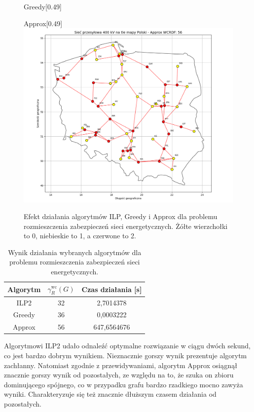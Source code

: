 \begin{figure}[htbp]
\begin{subcaptionbox}{Greedy\label{fig:img2}}[0.49\linewidth]
    \end{subcaptionbox}
    \hfill
    \begin{subcaptionbox}{Approx\label{fig:img1}}[0.49\linewidth]
        {\includegraphics[width=\linewidth]{assets/Poland/img_1.png}}
    \end{subcaptionbox}
    \caption{Efekt działania algorytmów ILP, Greedy i Approx dla problemu rozmieszczenia zabezpieczeń sieci energetycznych. Żółte wierzchołki to 0, niebieskie to 1, a czerwone to 2.}
    \label{fig:poland}
\end{figure}

\begin{table}[H]
    \centering
    \begin{tabular}{|c|c|c|}
        \hline
    Algorytm & $\gamma^{\text{wc}}_R(G)$ & Czas działania [s] \\     \hline
    ILP2 & 32 & 2,7014378 \\ \hline
    Greedy & 36 & 0,0003222 \\ \hline
Approx & 56 & 647,6564676 \\ \hline
\end{tabular}
\caption{Wynik działania wybranych algorytmów dla problemu rozmieszczenia zabezpieczeń sieci energetycznych.}
\end{table}

Algorytmowi ILP2 udało odnaleźć optymalne rozwiązanie w ciągu dwóch sekund, co jest bardzo dobrym wynikiem. Nieznacznie gorszy wynik prezentuje algorytm zachłanny. Natomiast zgodnie z przewidywaniami, algorytm Approx osiągnął znacznie gorszy wynik od pozostałych, ze względu na to, że szuka on zbioru dominującego spójnego, co w przypadku grafu bardzo rzadkiego mocno zawyża wyniki. Charakteryzuje się też znacznie dłuższym czasem działania od pozostałych.

